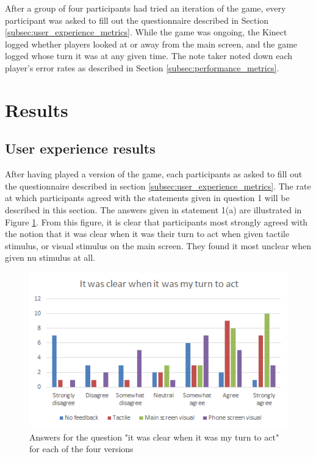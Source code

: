 After a group of four participants had tried an iteration of the game, every participant was asked to fill out the questionnaire described in Section \ref{subsec:user_experience_metrics}. While the game was ongoing, the Kinect logged whether players looked at or away from the main screen, and the game logged whose turn it was at any given time. The note taker noted down each player's error rates as described in Section \ref{subsec:performance_metrics}.

\section{Results}
\subsection{User experience results}
After having played a version of the game, each participants as asked to fill out the questionnaire described in section \ref{subsec:user_experience_metrics}. The rate at which participants agreed with the statements given in question 1 will be described in this section. The answers given in statement 1(a) are illustrated in Figure \ref{fig:questionnaire_a}. From this figure, it is clear that participants most strongly agreed with the notion that it was clear when it was their turn to act when given tactile stimulus, or visual stimulus on the main screen. They found it most unclear when given nu stimulus at all.

\begin{figure}[h!]
	\centering
	\includegraphics[scale=1]{figures/questionnaire_a.png}
	\caption{Answers for the question "it was clear when it was my turn to act" for each of the four versions}\label{fig:questionnaire_a}
\end{figure}

